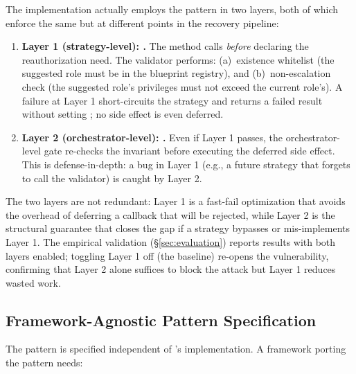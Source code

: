 The \system{} implementation actually employs the \reauthgate{} pattern in two layers, both of which enforce the same \privinv{} but at different points in the recovery pipeline:

\begin{enumerate}[leftmargin=*]
    \item \textbf{Layer 1 (strategy-level): .} The  method calls  \emph{before} declaring the reauthorization need. The validator performs: (a)~existence whitelist (the suggested role must be in the blueprint registry), and (b)~non-escalation check (the suggested role's privileges must not exceed the current role's). A failure at Layer 1 short-circuits the strategy and returns a failed result without setting ; no side effect is even deferred.
    \item \textbf{Layer 2 (orchestrator-level): .} Even if Layer 1 passes, the orchestrator-level gate re-checks the invariant before executing the deferred side effect. This is defense-in-depth: a bug in Layer 1 (e.g., a future strategy that forgets to call the validator) is caught by Layer 2.
\end{enumerate}

The two layers are not redundant: Layer 1 is a fast-fail optimization that avoids the overhead of deferring a callback that will be rejected, while Layer 2 is the structural guarantee that closes the gap if a strategy bypasses or mis-implements Layer 1. The empirical validation (\S\ref{sec:evaluation}) reports results with both layers enabled; toggling Layer 1 off (the  baseline) re-opens the vulnerability, confirming that Layer 2 alone suffices to block the attack but Layer 1 reduces wasted work.

\subsection{Framework-Agnostic Pattern Specification}
\label{sec:pattern-spec}

The \reauthgate{} pattern is specified independent of \system{}'s implementation. A framework porting the pattern needs:

